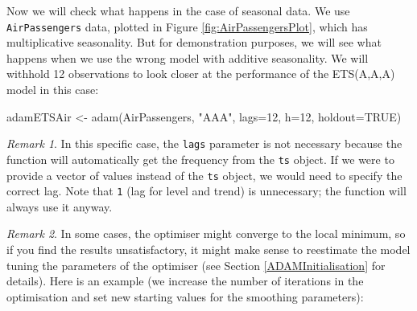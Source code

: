 \documentclass[
]{book}
\newenvironment{Shaded}{\begin{snugshade}}{\end{snugshade}}
\newcommand{\AttributeTok}[1]{\textcolor[rgb]{0.77,0.63,0.00}{#1}}
\newcommand{\ConstantTok}[1]{\textcolor[rgb]{0.00,0.00,0.00}{#1}}
\newcommand{\DecValTok}[1]{\textcolor[rgb]{0.00,0.00,0.81}{#1}}
\newcommand{\FloatTok}[1]{\textcolor[rgb]{0.00,0.00,0.81}{#1}}
\newcommand{\FunctionTok}[1]{\textcolor[rgb]{0.00,0.00,0.00}{#1}}
\newcommand{\NormalTok}[1]{#1}
\newcommand{\OtherTok}[1]{\textcolor[rgb]{0.56,0.35,0.01}{#1}}
\newcommand{\SpecialCharTok}[1]{\textcolor[rgb]{0.00,0.00,0.00}{#1}}
\newcommand{\StringTok}[1]{\textcolor[rgb]{0.31,0.60,0.02}{#1}}
\theoremstyle{definition}
\theoremstyle{definition}
\theoremstyle{definition}
\theoremstyle{definition}
\theoremstyle{remark}
\newtheorem*{remark}{Remark}
\begin{document}
Now we will check what happens in the case of seasonal data. We use \texttt{AirPassengers} data, plotted in Figure \ref{fig:AirPassengersPlot}, which has multiplicative seasonality. But for demonstration purposes, we will see what happens when we use the wrong model with additive seasonality. We will withhold 12 observations to look closer at the performance of the ETS(A,A,A) model in this case:

\begin{Shaded}
\begin{Highlighting}[]
\NormalTok{adamETSAir }\OtherTok{\textless{}{-}} \FunctionTok{adam}\NormalTok{(AirPassengers, }\StringTok{"AAA"}\NormalTok{, }\AttributeTok{lags=}\DecValTok{12}\NormalTok{,}
                   \AttributeTok{h=}\DecValTok{12}\NormalTok{, }\AttributeTok{holdout=}\ConstantTok{TRUE}\NormalTok{)}
\end{Highlighting}
\end{Shaded}

\begin{remark}
In this specific case, the \texttt{lags} parameter is not necessary because the function will automatically get the frequency from the \texttt{ts} object. If we were to provide a vector of values instead of the \texttt{ts} object, we would need to specify the correct lag. Note that \texttt{1} (lag for level and trend) is unnecessary; the function will always use it anyway.
\end{remark}

\begin{remark}
In some cases, the optimiser might converge to the local minimum, so if you find the results unsatisfactory, it might make sense to reestimate the model tuning the parameters of the optimiser (see Section \ref{ADAMInitialisation} for details). Here is an example (we increase the number of iterations in the optimisation and set new starting values for the smoothing parameters):
\end{remark}

\begin{Shaded}
\end{Shaded}
\end{document}
